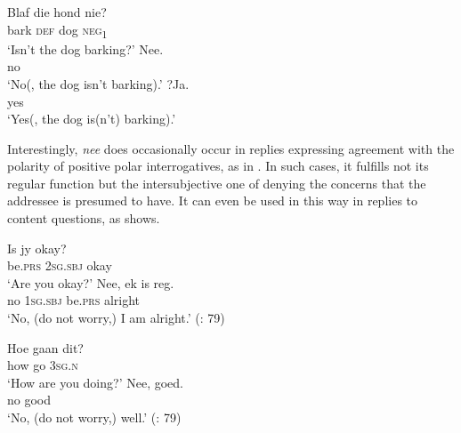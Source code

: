 \documentclass[output=paper,colorlinks,citecolor=brown]{langscibook}
\begin{document}
\ea\label{ex:afr:25}
    \begin{xlist}[A2:]
    \label{ex:afr:25a}
        \gll Blaf die hond nie?  \\ 
             bark \textsc{def} dog \textsc{neg}\textsubscript{1} \\ 
        \glt ‘Isn't the dog barking?’    
    \label{ex:afr:25b}
        \gll Nee. \\ 
             no  \\
        \glt ‘No(, the dog isn’t barking).’ 
    \label{ex:afr:25c}
        \gll  ?Ja. \\ 
              yes \\
        \glt  ‘Yes(, the dog is(n’t) barking).’
    \end{xlist}
\z 

Interestingly, \textit{nee} does occasionally occur in replies expressing agreement with the polarity of positive polar interrogatives, as in . In such cases, it fulfills not its regular function but the intersubjective one of denying the concerns that the addressee is presumed to have. It can even be used in this way in replies to content questions, as  shows.

\ea\label{ex:afr:26a}
    \begin{xlist}
    \label{ex:afr:26a.A}
        \gll Is jy okay? \\ 
             be.\textsc{prs} \textsc{2sg.sbj} okay\\
        \glt ‘Are you okay?’ 
    \label{ex:afr:26a.B}
        \gll Nee, ek is reg. \\ 
             no 1\textsc{sg.sbj} be.\textsc{prs} alright \\
        \glt ‘No, (do not worry,) I am alright.’  (\citealt{BiberauerEtAl2017}: 79) 
    \end{xlist}
\z 
\ea\label{ex:afr:26b}
    \begin{xlist}
    \label{ex:afr:26b.A}
        \gll Hoe gaan dit? \\
             how go \textsc{3sg.n} \\
        \glt  ‘How are you doing?’ 
    \label{ex:afr:26b.B}
        \gll Nee, goed. \\
             no good\\
        \glt ‘No, (do not worry,) well.’ (\citealt{BiberauerEtAl2017}: 79) 
    \end{xlist}
\z 
    
\end{document}
